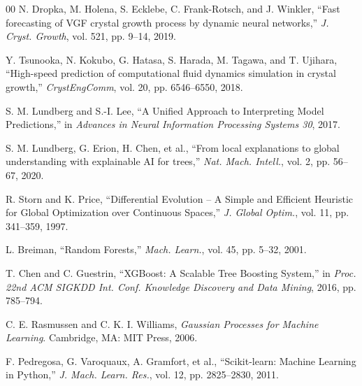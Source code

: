 \documentclass[conference]{IEEEtran}
\begin{document}
\begin{thebibliography}{00}
 N. Dropka, M. Holena, S. Ecklebe, C. Frank-Rotsch, and J. Winkler, ``Fast forecasting of VGF crystal growth process by dynamic neural networks,'' \emph{J. Cryst. Growth}, vol. 521, pp. 9--14, 2019.

 Y. Tsunooka, N. Kokubo, G. Hatasa, S. Harada, M. Tagawa, and T. Ujihara, ``High-speed prediction of computational fluid dynamics simulation in crystal growth,'' \emph{CrystEngComm}, vol. 20, pp. 6546--6550, 2018.

 S. M. Lundberg and S.-I. Lee, ``A Unified Approach to Interpreting Model Predictions,'' in \emph{Advances in Neural Information Processing Systems 30}, 2017.

 S. M. Lundberg, G. Erion, H. Chen, et al., ``From local explanations to global understanding with explainable AI for trees,'' \emph{Nat. Mach. Intell.}, vol. 2, pp. 56--67, 2020.

 R. Storn and K. Price, ``Differential Evolution -- A Simple and Efficient Heuristic for Global Optimization over Continuous Spaces,'' \emph{J. Global Optim.}, vol. 11, pp. 341--359, 1997.

 L. Breiman, ``Random Forests,'' \emph{Mach. Learn.}, vol. 45, pp. 5--32, 2001.

 T. Chen and C. Guestrin, ``XGBoost: A Scalable Tree Boosting System,'' in \emph{Proc. 22nd ACM SIGKDD Int. Conf. Knowledge Discovery and Data Mining}, 2016, pp. 785--794.

 C. E. Rasmussen and C. K. I. Williams, \emph{Gaussian Processes for Machine Learning}. Cambridge, MA: MIT Press, 2006.

 F. Pedregosa, G. Varoquaux, A. Gramfort, et al., ``Scikit-learn: Machine Learning in Python,'' \emph{J. Mach. Learn. Res.}, vol. 12, pp. 2825--2830, 2011.

\end{thebibliography}
\end{document}
